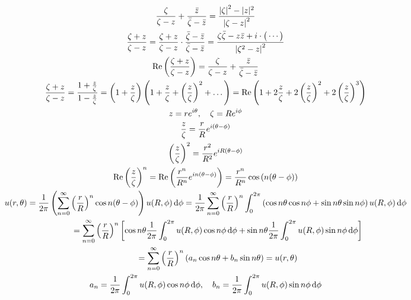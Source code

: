 \documentclass[12pt,a4paper,notitlepage,fleqn]{article}
\begin{document}
    \begin{gather*}
    	\frac{\zeta}{\zeta-z} + \frac{\bar z}{\bar \zeta - \bar z}
    	= \frac{\left|\zeta\right|^2-|z|^2}{\left|\zeta-z\right|^2} \\
        \frac{\zeta+z}{\zeta - z} 
        = \frac{\zeta+z}{\zeta - z}\cdot\frac{\bar\zeta-\bar z}{\bar \zeta - \bar z}   
        = \frac{\zeta\bar\zeta-z\bar z +i \cdot \big( \cdots
        	 \big)}{\left|\zeta^2-z\right|^2} 	\\
        \operatorname{Re}\left(\frac{\zeta+z}{\zeta-z}\right)
        =\frac{\zeta}{\zeta - z} + \frac{\bar z}{\bar\zeta - \bar z}
        \\
        \frac{\zeta + z}{\zeta - z} = \frac{1+\frac{z}{\zeta}}{1-\frac{z}{\zeta}}
        = \left(1+\frac{z}{\zeta}\right)\left(1+\frac{z}{\zeta}
        +\left(\frac{z}{\zeta}\right)^2+\dots
        \right)
        = \operatorname{Re}\left(
        1+2\frac{z}{\zeta}+2\left(\frac{z}{\zeta}\right)^2
        +2\left(\frac{z}{\zeta}\right)^3
        \right)
        \\
        z=re^{i\theta}, \quad \zeta = Re^{i\phi} \\
        \frac{z}{\zeta} = \frac{r}{R} e^{i(\theta-\phi)} \\
        \left(\frac{z}{\zeta}\right)^2 = \frac{r^2}{R^2}
        e^{iR(\theta-\phi)} \\
        \operatorname{Re}\left(\frac{z}{\zeta}\right)^n
        = \operatorname{Re}\left(
        \frac{r^n}{R^n}e^{in(\theta-\phi)}
        \right) = \frac{r^n}{R^n}\cos\left(n(\theta-\phi)\right)
        \\
        u(r,\theta) = \frac{1}{2\pi}
        \left(
        \sum_{n=0}^\infty \left(\frac{r}{R}\right)^n
        \cos n(\theta-\phi)
        \right) u(R,\phi)\mathop{}\!\mathrm{d}\phi
        = \frac{1}{2\pi} \sum_{n=0}^{\infty} \left(\frac{r}{R}\right)^n
        \int_0^{2\pi} \left(\cos n\theta\cos n\phi + \sin n\theta\sin n\phi
        \right) u(R,\phi)\mathop{}\!\mathrm{d} \phi
        \\ \hphantom{u(r,\theta)} =
        \sum_{n=0}^{\infty} \left(\frac{r}{R}\right)^n
        \left[\cos n\theta \frac{1}{2\pi}
        \int_{0}^{2\pi} u(R,\phi) \cos n\phi \mathop{}\!\mathrm{d}\phi
        + \sin n\theta \frac{1}{2\pi} \int_{0}^{2\pi}
        u(R,\phi) \sin n\phi \mathop{}\!\mathrm{d}\phi
        \right]
        \\ \hphantom{u(r,\theta)} = 
        \sum_{n=0}^{\infty} \left( \frac{r}{R} \right)^n
        (
        a_n\cos n\theta +b_n\sin n\theta
        ) = u(r,\theta)
        \\
        a_n = \frac{1}{2\pi} \int_{0}^{2\pi} u(R,\phi) \cos n\phi\mathop{}\!\mathrm{d}\phi,
        \quad
        b_n = \frac{1}{2\pi} \int_{0}^{2\pi} u(R,\phi) \sin n\phi\mathop{}\!\mathrm{d}\phi
    \end{gather*}
    
\end{document}
